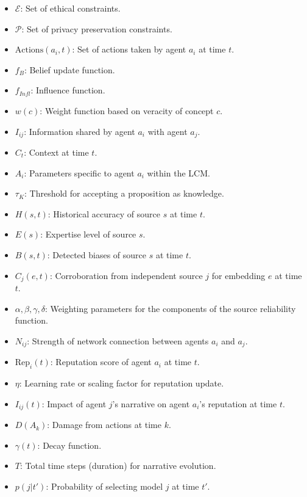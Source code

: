 \documentclass[12pt, a4paper]{article}
\begin{document}
\begin{itemize}
    \item \( \mathcal{E} \): Set of ethical constraints.
    \item \( \mathcal{P} \): Set of privacy preservation constraints.
    \item \( \text{Actions}(a_i, t) \): Set of actions taken by agent \( a_i \) at time \( t \).
    \item \( f_B \): Belief update function.
    \item \( f_{Infl} \): Influence function.
    \item \( w(c) \): Weight function based on veracity of concept \( c \).
    \item \( I_{ij} \): Information shared by agent \( a_i \) with agent \( a_j \).
    \item \( C_t \): Context at time \( t \).
    \item \( A_i \): Parameters specific to agent \( a_i \) within the LCM.
    \item \( \tau_K \): Threshold for accepting a proposition as knowledge.
    \item \( H(s,t) \): Historical accuracy of source \(s\) at time \(t\).
    \item \( E(s) \): Expertise level of source \(s\).
    \item \( B(s,t) \): Detected biases of source \(s\) at time \(t\).
    \item \( C_j(e,t) \): Corroboration from independent source \(j\) for embedding \(e\) at time \(t\).
    \item \( \alpha, \beta, \gamma, \delta \): Weighting parameters for the components of the source reliability function.
    \item \( N_{ij} \): Strength of network connection between agents \( a_i \) and \( a_j \).
    \item \( \text{Rep}_i(t) \): Reputation score of agent \( a_i \) at time \( t \).
    \item \( \eta \): Learning rate or scaling factor for reputation update.
    \item \( I_{ij}(t) \): Impact of agent \( j \)'s narrative on agent \( a_i \)'s reputation at time \( t \).
    \item \( D(A_k) \): Damage from actions at time \( k \).
    \item \( \gamma(t) \): Decay function.
    \item \( T \):  Total time steps (duration) for narrative evolution.
    \item \( p(j|t') \): Probability of selecting model \( j \) at time \( t' \).
  



\end{itemize}
\end{document}
